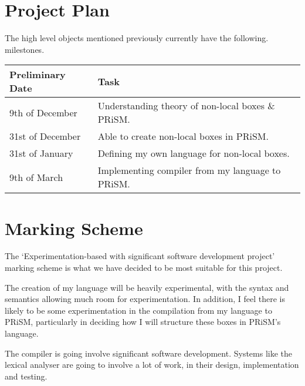 \documentclass[11pt, a4paper]{article}
\begin{document}
\section{Project Plan} %
\label{sec:project_plan}
The high level objects mentioned previously currently have the following.
milestones.

\begin{center}
    \begin{tabular}{l | p{7.5cm}}
        Preliminary Date & Task \\
        \hline
        9th of December & Understanding theory of non-local boxes \& PRiSM. \\

        31st of December & Able to create non-local boxes in PRiSM. \\

        31st of January & Defining my own language for non-local boxes. \\

        9th of March & Implementing compiler from my language to PRiSM. \\
\end{tabular}
\end{center}


\section{Marking Scheme} %
\label{sec:marking_scheme}
The `Experimentation-based with significant software development project'
marking scheme is what we have decided to be most suitable for this project.

The creation of my language will be heavily experimental, with the syntax and
semantics allowing much room for experimentation. In addition, I feel there is
likely to be some experimentation in the compilation from my language to PRiSM,
particularly in deciding how I will structure these boxes in PRiSM's language.

The compiler is going involve significant software development. Systems like the
lexical analyser are going to involve a lot of work, in their design,
implementation and testing.

\newpage


\end{document}
